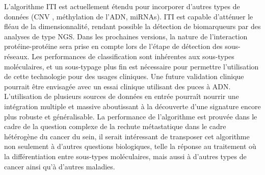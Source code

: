 		L'algorithme ITI est actuellement étendu pour incorporer d'autres types de données (\acs{CNV} \citep{Garcia2013}, méthylation de l'ADN, \acsp{miRNA}).
		ITI est capable d'atténuer le fléau de la dimensionnalité, rendant possible la détection de biomarqueurs par des analyses de type \acs{NGS}.
		Dans les prochaines versions, la nature de l'interaction protéine-protéine sera prise en compte lors de l'étape de détection des sous-réseaux.
		Les performances de classification sont inhérentes aux sous-types moléculaires, et un sous-typage plus fin est nécessaire pour permettre l'utilisation de cette technologie pour des usages cliniques.
		Une future validation clinique pourrait être envisagée avec un essai clinique utilisant des puces à ADN.
		L'utilisation de plusieurs sources de données en entrée pourraît nourrir une intégration multiple et massive aboutissant à la découverte d'une signature encore plus robuste et généralisable.
		La performance de l'algorithme est prouvée dans le cadre de la question complexe de la rechute métastatique dans le cadre hétérogène du cancer du sein, il serait intéressant de transposer cet algorithme non seulement à d'autres questions biologiques, telle la réponse au traitement où la différentiation entre sous-types moléculaires, mais aussi à d'autres types de cancer ainsi qu'à d'autres maladies.